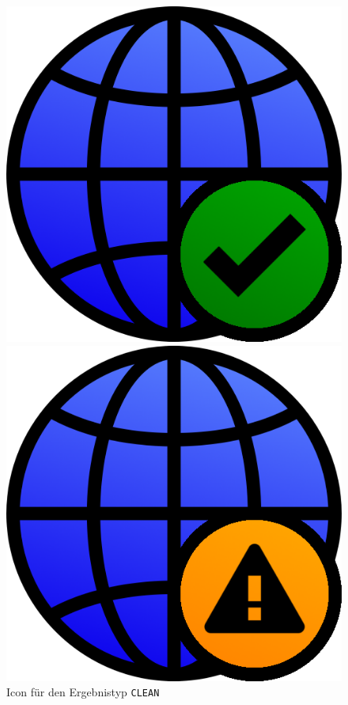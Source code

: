 \begin{figure}[H]
	\begin{minipage}{0.2\textwidth}
		\includegraphics[width=\linewidth]{images/webifier-clean}
		\caption{Icon für den Ergebnistyp \texttt{CLEAN}}
	\end{minipage}\hfill
	\begin{minipage}{0.2\textwidth}
		\includegraphics[]{images/webifier-suspicious}

\end{minipage}
\end{figure}
